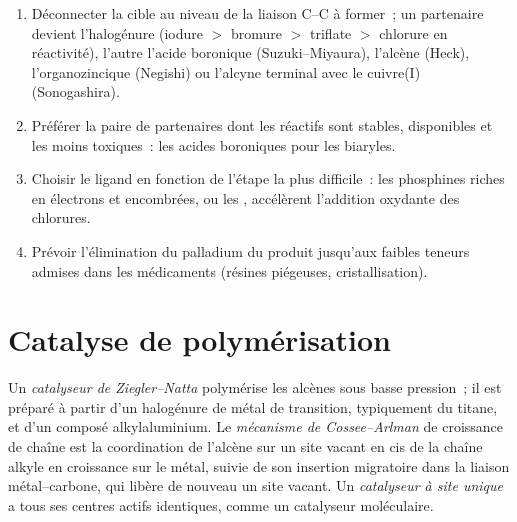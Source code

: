 \begin{method}\label{met:b3:homogeneous-catalysis:choose-coupling}
\begin{enumerate}
  \item Déconnecter la cible au niveau de la liaison C--C à former~; un
        partenaire devient l'halogénure (iodure $>$ bromure $>$ triflate $>$ chlorure en réactivité), l'autre
        l'acide boronique (Suzuki--Miyaura), l'alcène (Heck), l'organozincique
        (Negishi) ou l'alcyne terminal avec le cuivre(I) (Sonogashira).
  \item Préférer la paire de partenaires dont les réactifs sont stables,
        disponibles et les moins toxiques~: les acides boroniques pour les
        biaryles.
  \item Choisir le ligand en fonction de l'étape la plus difficile~: les
        phosphines riches en électrons et encombrées, ou les , accélèrent l'addition oxydante des chlorures.
  \item Prévoir l'élimination du palladium du produit jusqu'aux faibles
        teneurs admises dans les médicaments (résines piégeuses,
        cristallisation).
\end{enumerate}
\end{method}

\section{Catalyse de polymérisation}

\begin{definition}\label{def:b3:homogeneous-catalysis:ziegler-natta}
Un \emph{catalyseur de Ziegler--Natta} polymérise
les alcènes sous basse pression~; il est préparé à partir d'un halogénure de
métal de transition, typiquement du titane, et d'un composé
alkylaluminium. Le \emph{mécanisme de Cossee--Arlman} de croissance de
chaîne est la coordination de l'alcène sur un site vacant en cis de la
chaîne alkyle en croissance sur le métal, suivie de son insertion
migratoire dans la liaison métal--carbone, qui libère de nouveau un site
vacant. Un \emph{catalyseur à site unique} a tous ses centres
actifs identiques, comme un catalyseur  moléculaire.
\end{definition}

